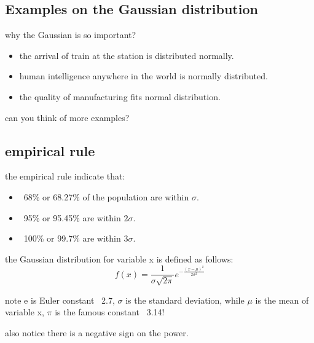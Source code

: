 \documentclass[4apaper,12pt]{book}
\begin{document}
\begin{description}
\begin{description}
    \subsection{Examples on the Gaussian distribution}
    \item why the Gaussian is so important?
    \begin{itemize}
    \item the arrival of train at the station is distributed normally.
    \item human intelligence anywhere in the world is normally distributed.
    \item the quality of manufacturing fits normal distribution.
    \end{itemize}
    \item can you think of more examples?
    \subsection{empirical rule}
    \begin{description}
    \item the empirical rule indicate that:
      \begin{itemize}
        \item ~68\% or 68.27\% of the population are within $\sigma$.
        \item ~95\% or 95.45\% are within $2\sigma$.
          \item ~100\% or 99.7\% are within $3\sigma$.
      \end{itemize}
    \item the Gaussian distribution for variable x is defined as follows:
      \begin{equation} f(x) = \frac{1}{\sigma\sqrt{2\pi}}e^{-\frac{(x-\mu)^2}{2\sigma^2}} \end{equation}
    \item note e is Euler constant ~2.7, $\sigma$ is the standard deviation, while $\mu$ is the mean of variable x, $\pi$ is the famous constant ~3.14!
    \item also notice there is a negative sign on the power.
    \end{description}
    \end{description}

\end{description}
\end{document}

